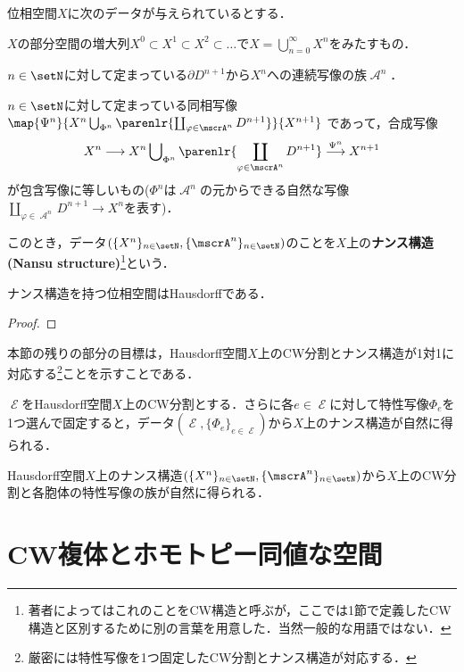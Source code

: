 \documentclass[uplatex]{jsarticle}
\begin{document}
\begin{definition}
  位相空間$X$に次のデータが与えられているとする．
  \begin{enumarabicp}
    \item
    $X$の部分空間の増大列$X^0\subset X^1 \subset X^2\subset \dots$で$X = \bigcup _{n=0}^\infty X^n$をみたすもの．
    \item
    $n\in \setN$に対して定まっている$\partial D^{n+1}$から$X^n$への連続写像の族$\mscrA^n$．
    \item
    $n\in \setN$に対して定まっている同相写像$\map{\Psi^n}{X^n\bigcup_{\Phi^n} \parenlr{\coprod_{\varphi\in \mscrA^n}D^{n+1}}}{X^{n+1}}$
    であって，合成写像
    \[X^n\longrightarrow X^n\sideset{}{_{\Phi^n}} \bigcup \parenlr{\coprod_{\varphi\in \mscrA^n}D^{n+1}} \stackrel{\Psi^n}{\longrightarrow} X^{n+1} \]
    が包含写像に等しいもの($\Phi^n$は$\mscrA^n$の元からできる自然な写像$\coprod_{\varphi\in \mscrA^n}D^{n+1}\to X^n$を表す)．
  \end{enumarabicp}
  このとき，データ$(\{X^n\}_{n\in \setN}, \{\mscrA^n\}_{n\in \setN})$のことを$X$上の\textbf{ナンス構造(Nansu structure)}\footnote{著者によってはこれのことをCW構造と呼ぶが，ここでは1節で定義したCW構造と区別するために別の言葉を用意した．当然一般的な用語ではない．}という．
\end{definition}

\begin{proposition}
  ナンス構造を持つ位相空間はHausdorffである．
\end{proposition}
\begin{proof}

\end{proof}

本節の残りの部分の目標は，Hausdorff空間$X$上のCW分割とナンス構造が1対1に対応する\footnote{厳密には特性写像を1つ固定したCW分割とナンス構造が対応する．}ことを示すことである．

\begin{theorem}
  $\mscrE$をHausdorff空間$X$上のCW分割とする．さらに各$e\in \mscrE$に対して特性写像$\Phi_e$を1つ選んで固定すると，データ$(\mscrE, \{\Phi_e\}_{e\in \mscrE})$から$X$上のナンス構造が自然に得られる．
\end{theorem}

\begin{theorem}
  Hausdorff空間$X$上のナンス構造$(\{X^n\}_{n\in \setN}, \{\mscrA^n\}_{n\in \setN})$から$X$上のCW分割と各胞体の特性写像の族が自然に得られる．
\end{theorem}

\section{CW複体とホモトピー同値な空間}
\end{document}
